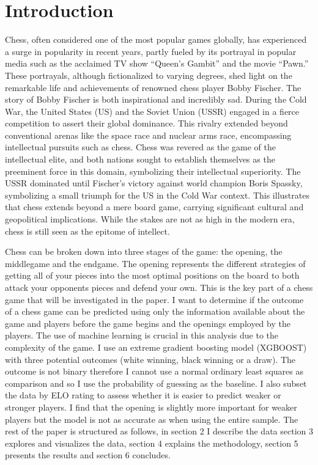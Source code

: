\documentclass[12pt,preprint, authoryear]{elsarticle}
\numberwithin{equation}{section}
\numberwithin{figure}{section}
\numberwithin{table}{section}
\begin{document}
\hypertarget{introduction}{%
\section{\texorpdfstring{Introduction
\label{Introduction}}{Introduction }}\label{introduction}}

Chess, often considered one of the most popular games globally, has
experienced a surge in popularity in recent years, partly fueled by its
portrayal in popular media such as the acclaimed TV show ``Queen's
Gambit'' and the movie ``Pawn.'' These portrayals, although
fictionalized to varying degrees, shed light on the remarkable life and
achievements of renowned chess player Bobby Fischer. The story of Bobby
Fischer is both inspirational and incredibly sad. During the Cold War,
the United States (US) and the Soviet Union (USSR) engaged in a fierce
competition to assert their global dominance. This rivalry extended
beyond conventional arenas like the space race and nuclear arms race,
encompassing intellectual pursuits such as chess. Chess was revered as
the game of the intellectual elite, and both nations sought to establish
themselves as the preeminent force in this domain, symbolizing their
intellectual superiority. The USSR dominated until Fischer's victory
against world champion Boris Spassky, symbolizing a small triumph for
the US in the Cold War context. This illustrates that chess extends
beyond a mere board game, carrying significant cultural and geopolitical
implications. While the stakes are not as high in the modern era, chess
is still seen as the epitome of intellect.

Chess can be broken down into three stages of the game: the opening, the
middlegame and the endgame. The opening represents the different
strategies of getting all of your pieces into the most optimal positions
on the board to both attack your opponents pieces and defend your own.
This is the key part of a chess game that will be investigated in the
paper. I want to determine if the outcome of a chess game can be
predicted using only the information available about the game and
players before the game begins and the openings employed by the players.
The use of machine learning is crucial in this analysis due to the
complexity of the game. I use an extreme gradient boosting model
(XGBOOST) with three potential outcomes (white winning, black winning or
a draw). The outcome is not binary therefore I cannot use a normal
ordinary least squares as comparison and so I use the probability of
guessing as the baseline. I also subset the data by ELO rating to assess
whether it is easier to predict weaker or stronger players. I find that
the opening is slightly more important for weaker players but the model
is not as accurate as when using the entire sample. The rest of the
paper is structured as follows, in section 2 I describe the data section
3 explores and visualizes the data, section 4 explains the methodology,
section 5 presents the results and section 6 concludes.
\end{document}
